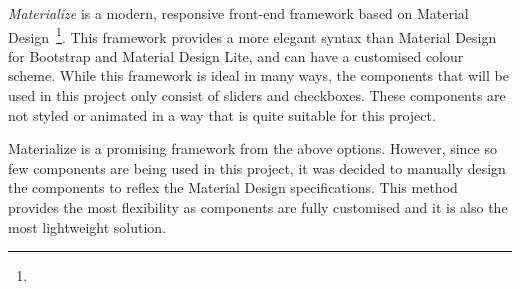 {{		\emph{Materialize} is a modern, responsive front-end framework based on Material Design~\footnote{}. This framework provides a more elegant syntax than Material Design for Bootstrap and Material Design Lite, and can have a customised colour scheme. While this framework is ideal in many ways, the components that will be used in this project only consist of sliders and checkboxes. These components are not styled or animated in a way that is quite suitable for this project.

		Materialize is a promising framework from the above options. However, since so few components are being used in this project, it was decided to manually design the components to reflex the Material Design specifications. This method provides the most flexibility as components are fully customised and it is also the most lightweight solution.

	}

}
	
